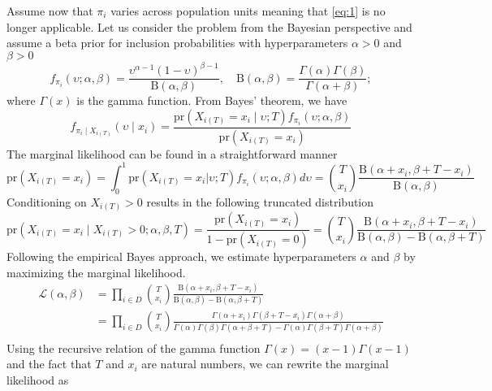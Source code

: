 \documentclass[manuscript]{biometrika}
\begin{document}
Assume now that $\pi_i$ varies across population units meaning that \eqref{eq:1} is no longer applicable. Let us consider the problem from the Bayesian perspective and assume a beta prior for inclusion probabilities with hyperparameters $\alpha > 0$ and $\beta > 0$
\begin{equation*}
f_{\pi_i}(\upsilon; \alpha, \beta) = \frac{\upsilon^{\alpha - 1}(1 - \upsilon)^{\beta - 1}}{\mathrm{B}(\alpha, \beta)}, \quad \mathrm{B}(\alpha, \beta) = \frac{\Gamma(\alpha)\Gamma(\beta)}{\Gamma(\alpha + \beta)};
\end{equation*}
where $\Gamma(x)$ is the gamma function. From Bayes' theorem, we have
\begin{equation*}
f_{\pi_i \mid X_{i(T)}} (\upsilon \mid x_i) = \frac{\text{pr}(X_{i(T)} = x_i \mid \upsilon; T) f_{\pi_i}(\upsilon; \alpha, \beta)}{\text{pr}(X_{i(T)} = x_i)}
\end{equation*}
The marginal likelihood can be found in a straightforward manner
\begin{equation*}
\text{pr}(X_{i(T)} = x_i) = \int_0^1 \text{pr}(X_{i(T)} = x_i | \upsilon; T)f_{\pi_i}(\upsilon; \alpha, \beta)d\upsilon = \binom{T}{x_i} \frac{\mathrm{B}(\alpha + x_i, \beta + T - x_i)}{\mathrm{B}(\alpha, \beta)}
\end{equation*}
Conditioning on $X_{i(T)} > 0$ results in the following truncated distribution
\begin{equation*}
\text{pr}(X_{i(T)} = x_i \mid X_{i(T)} > 0; \alpha, \beta, T) = \frac{\text{pr}(X_{i(T)} = x_i)}{1 - \text{pr}(X_{i(T)} = 0)} = \binom{T}{x_i} \frac{\mathrm{B}(\alpha + x_i, \beta + T - x_i)}{\mathrm{B}(\alpha, \beta) - \mathrm{B}(\alpha, \beta + T)}
\end{equation*}
Following the empirical Bayes approach, we estimate hyperparameters $\alpha$ and $\beta$ by maximizing the marginal likelihood.
\begin{align*}
    \mathcal{L}(\alpha, \beta) &= \prod_{i \in D} \binom{T}{x_i} \frac{\mathrm{B}(\alpha + x_i, \beta + T - x_i)}{\mathrm{B}(\alpha, \beta) - \mathrm{B}(\alpha, \beta + T)} \\
    &= \prod_{i \in D} \binom{T}{x_i} \frac{\Gamma(\alpha + x_i)\Gamma(\beta + T - x_i)\Gamma(\alpha + \beta)}{\Gamma(\alpha)\Gamma(\beta)\Gamma(\alpha + \beta + T) - \Gamma(\alpha)\Gamma(\beta + T)\Gamma(\alpha + \beta)} \\
\end{align*}
Using the recursive relation of the gamma function $\Gamma(x) = (x - 1)\Gamma(x - 1)$ and the fact that $T$ and $x_i$ are natural numbers, we can rewrite the marginal likelihood as
\end{document}
